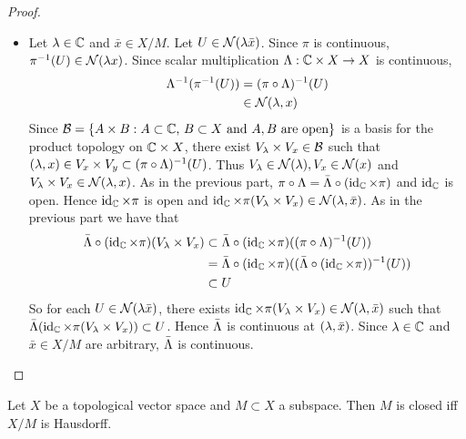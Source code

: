 \documentclass{book}
\begin{document}
\begin{proof}
\begin{itemize}
			\item Let $\lambda \in \mathbb{C}$ and $\bar{x} \in X / M$. Let $U \in \mathcal{N}(\lambda \bar{x})$. Since $\pi$ is continuous, $\pi^{-1}(U) \in \mathcal{N}(\lambda x)$. Since scalar multiplication $\Lambda: \mathbb{C} \times X  \rightarrow X$ is continuous, 
			\begin{align*}
				\Lambda^{-1}(\pi^{-1}(U)) 
				& = (\pi \circ \Lambda)^{-1}( U) \\
				& \in \mathcal{N}(\lambda, x)
			\end{align*} 
			Since $\mathcal{B} = \{A \times B: \text{$A \subset \mathbb{C}$, $B \subset X$ and $A,B$ are open}\}$ is a basis for the product topology on $\mathbb{C} \times X$, there exist $V_{\lambda} \times V_x \in \mathcal{B}$ such that $(\lambda,x) \in V_x \times V_y \subset  (\pi \circ \Lambda)^{-1}(U)$. Thus $V_{\lambda} \in \mathcal{N}(\lambda), V_x \in \mathcal{N}(x)$ and $V_{\lambda} \times V_x \in \mathcal{N}(\lambda, x)$. As in the previous part, $\pi \circ \Lambda = \bar{\Lambda} \circ (\operatorname{id}_{\mathbb{C}} \times \pi)$ and $\operatorname{id}_{\mathbb{C}}$ is open. Hence $\operatorname{id}_{\mathbb{C}} \times \pi$ is open and $\operatorname{id}_{\mathbb{C}} \times \pi (V_{\lambda} \times V_x) \in \mathcal{N}(\lambda, \bar{x})$. As in the previous part we have that 
			\begin{align*}
				\bar{\Lambda} \circ (\operatorname{id}_{\mathbb{C}} \times \pi) (V_{\lambda} \times V_x) 
				& \subset \bar{\Lambda} \circ (\operatorname{id}_{\mathbb{C}} \times \pi)((\pi \circ \Lambda)^{-1}(U)) \\
				& = \bar{\Lambda} \circ (\operatorname{id}_{\mathbb{C}} \times \pi)((\bar{\Lambda} \circ (\operatorname{id}_{\mathbb{C}} \times \pi))^{-1}(U)) \\
				& \subset U
			\end{align*} 
			So for each $U \in \mathcal{N}(\lambda \bar{x})$, there exists $\operatorname{id}_{\mathbb{C}} \times \pi(V_{\lambda} \times V_x) \in \mathcal{N}(\lambda, \bar{x})$ such that $\bar{\Lambda}(\operatorname{id}_{\mathbb{C}} \times \pi(V_{\lambda} \times V_x)) \subset U$. Hence $\bar{\Lambda}$ is continuous at $(\lambda, \bar{x})$. Since $\lambda \in \mathbb{C}$ and $\bar{x} \in X/ M$ are arbitrary, $\bar{\Lambda}$ is continuous. 
		\end{itemize}
	\end{proof}

	\begin{ex}
		Let $X$ be a topological vector space and $M \subset X$ a subspace. Then $M$ is closed iff $X / M$ is Hausdorff. 
	\end{ex}
	
\end{document}
